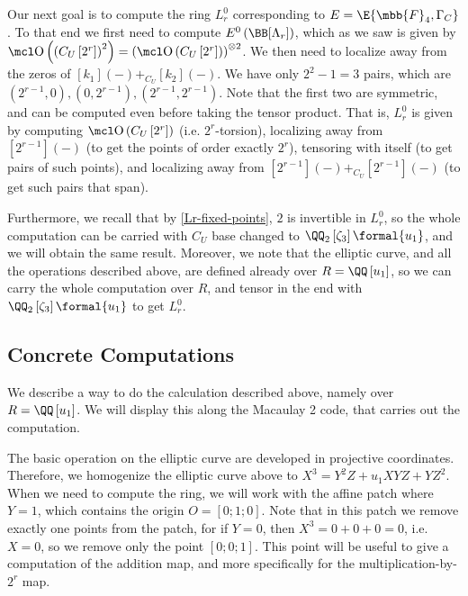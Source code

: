 Our next goal is to compute the ring $L_r^0$ corresponding to $E = \E{\mbb{F}_4, \Gamma_C}$.
To that end we first need to compute $E^0\left(\BB[\Lambda_r]\right)$, which as we saw is given by $\OO\left(\left(C_U\left[2^r\right]\right)^2\right) = \left(\OO\left(C_U\left[2^r\right]\right)\right)^{\otimes 2}$.
We then need to localize away from the zeros of $[k_1]\left(-\right) +_{C_U} [k_2]\left(-\right)$.
We have only $2^2-1=3$ pairs, which are $\left(2^{r-1},0\right), \left(0,2^{r-1}\right), \left(2^{r-1},2^{r-1}\right)$.
Note that the first two are symmetric, and can be computed even before taking the tensor product.
That is, $L_r^0$ is given by computing $\OO\left(C_U\left[2^r\right]\right)$ (i.e. $2^r$-torsion), localizing away from $[2^{r-1}]\left(-\right)$ (to get the points of order exactly $2^r$), tensoring with itself (to get pairs of such points), and localizing away from $[2^{r-1}]\left(-\right) +_{C_U} [2^{r-1}]\left(-\right)$ (to get such pairs that span).

Furthermore, we recall that by \ref{Lr-fixed-points}, $2$ is invertible in $L_r^0$, so the whole computation can be carried with $C_U$ base changed to $\QQ_2\left[\zeta_3\right]\formal{u_1}$, and we will obtain the same result.
Moreover, we note that the elliptic curve, and all the operations described above, are defined already over $R = \QQ\left[u_1\right]$, so we can carry the whole computation over $R$, and tensor in the end with $\QQ_2\left[\zeta_3\right]\formal{u_1}$ to get $L_r^0$.



\subsection{Concrete Computations}

We describe a way to do the calculation described above, namely over $R = \QQ\left[u_1\right]$.
We will display this along the Macaulay 2 code, that carries out the computation.

The basic operation on the elliptic curve are developed in projective coordinates.
Therefore, we homogenize the elliptic curve above to $X^3 = Y^2 Z + u_1 X Y Z + Y Z^2$.
When we need to compute the ring, we will work with the affine patch where $Y = 1$, which contains the origin $O = \left[0;1;0\right]$.
Note that in this patch we remove exactly one points from the patch, for if $Y = 0$, then $X^3 = 0 + 0 + 0 = 0$, i.e. $X = 0$, so we remove only the point $\left[0;0;1\right]$.
This point will be useful to give a computation of the addition map, and more specifically for the multiplication-by-$2^r$ map.

